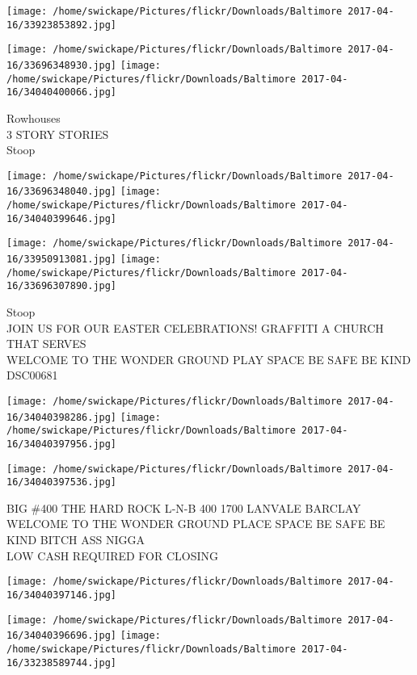 \documentclass[10pt,letterpaper]{article}
\begin{document}
\texttt{[image: /home/swickape/Pictures/flickr/Downloads/Baltimore 2017-04-16/33923853892.jpg]}

\vspace{0.25in}
\texttt{[image: /home/swickape/Pictures/flickr/Downloads/Baltimore 2017-04-16/33696348930.jpg]}
\texttt{[image: /home/swickape/Pictures/flickr/Downloads/Baltimore 2017-04-16/34040400066.jpg]}

Rowhouses\\
3 STORY STORIES\\
Stoop\\
\pagebreak

\texttt{[image: /home/swickape/Pictures/flickr/Downloads/Baltimore 2017-04-16/33696348040.jpg]}
\texttt{[image: /home/swickape/Pictures/flickr/Downloads/Baltimore 2017-04-16/34040399646.jpg]}

\texttt{[image: /home/swickape/Pictures/flickr/Downloads/Baltimore 2017-04-16/33950913081.jpg]}
\texttt{[image: /home/swickape/Pictures/flickr/Downloads/Baltimore 2017-04-16/33696307890.jpg]}

Stoop\\
JOIN US FOR OUR EASTER CELEBRATIONS!  GRAFFITI A CHURCH THAT SERVES\\
WELCOME TO THE WONDER GROUND PLAY SPACE BE SAFE BE KIND\\
DSC00681\\
\pagebreak

\texttt{[image: /home/swickape/Pictures/flickr/Downloads/Baltimore 2017-04-16/34040398286.jpg]}
\texttt{[image: /home/swickape/Pictures/flickr/Downloads/Baltimore 2017-04-16/34040397956.jpg]}

\texttt{[image: /home/swickape/Pictures/flickr/Downloads/Baltimore 2017-04-16/34040397536.jpg]}

BIG \#400 THE HARD ROCK L{-}N{-}B 400 1700 LANVALE BARCLAY\\
WELCOME TO THE WONDER GROUND PLACE SPACE BE SAFE BE KIND BITCH ASS NIGGA\\
LOW CASH REQUIRED FOR CLOSING\\
\pagebreak

\texttt{[image: /home/swickape/Pictures/flickr/Downloads/Baltimore 2017-04-16/34040397146.jpg]}

\vspace{0.25in}
\texttt{[image: /home/swickape/Pictures/flickr/Downloads/Baltimore 2017-04-16/34040396696.jpg]}
\texttt{[image: /home/swickape/Pictures/flickr/Downloads/Baltimore 2017-04-16/33238589744.jpg]}
\end{document}
